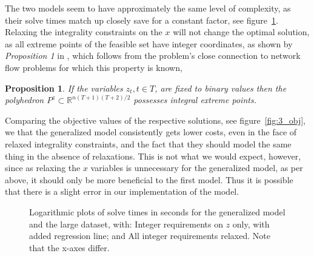 \documentclass{article}
\newtheorem{prop}{Proposition}
\begin{document}
The two models seem to have approximately the same level of complexity,
as their solve times match up closely save for a constant factor,
see figure~\ref{fig:3_cpu}.
Relaxing the integrality constraints on the $x$ will not change the optimal solution,
as all extreme points of the feasible set have integer coordinates,
as shown by \textit{Proposition 1} in \autocite{gustavsson14}, which follows from the problem's close connection to network flow problems for which this property is known,
\begin{prop}
If the variables $z_t, t \in T$, are fixed to binary values then the polyhedron $P^z \subset \mathbb{R}^{n(T+1)(T+2)/2}$ possesses integral extreme points.
\end{prop}
Comparing the objective values of the respective solutions,
see figure~\ref{fig:3_obj},
we that the generalized model consistently gets lower costs,
even in the face of relaxed integrality constraints,
and the fact that they should model the same thing
in the absence of relaxations.
This is not what we would expect, however,
since as relaxing the $x$ variables is unnecessary for the generalized model,
as per above,
it should only be more beneficial to the first model.
Thus it is possible that there is a slight error in our implementation of the model.

\begin{figure}
    \centering
    \caption{Logarithmic plots of solve times in seconds 
    for the generalized model and the large dataset, with:
    \protect{} Integer requirements on $z$ only,
    with added regression line; and
    \protect{} All integer requirements relaxed.
    Note that the x-axes differ. \label{fig:3_cpu}}
\end{figure}
\end{document}
